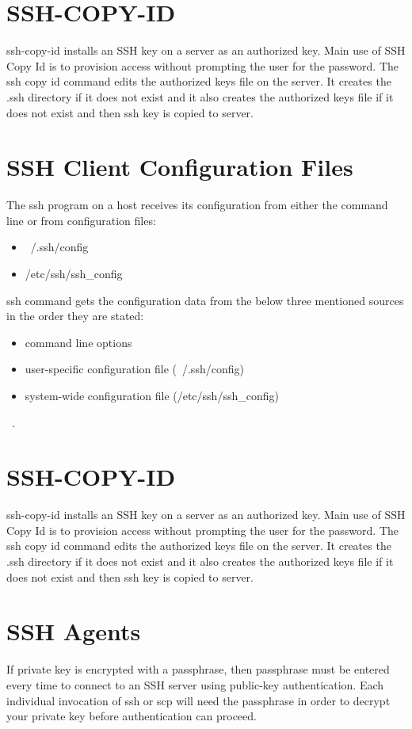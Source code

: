 \section{SSH-COPY-ID}
ssh-copy-id installs an SSH key on a server as an authorized key. 
Main use of SSH Copy Id is to provision access without prompting
the user for the password. The ssh copy id command edits the 
authorized keys file on the server. It creates the .ssh directory 
if it does not exist and it also creates the authorized keys file
if it does not exist and then ssh key is copied to server.

\section{SSH Client Configuration Files}
The ssh program on a host receives its configuration from either
the command line or from configuration files:
\begin{itemize}
\item ~/.ssh/config
\item /etc/ssh/ssh\_config
\end{itemize}

ssh command gets the configuration data from the below three 
mentioned sources in the order they are stated:

\begin{itemize}
\item command line options
\item user-specific configuration file (~/.ssh/config)
\item system-wide configuration file (/etc/ssh/ssh\_config)
\end{itemize}
~\cite{hid-sp18-513-sshkeyinc}. 

\section{SSH-COPY-ID}
ssh-copy-id installs an SSH key on a server as an authorized key. 
Main use of SSH Copy Id is to provision access without prompting
the user for the password. The ssh copy id command edits the 
authorized keys file on the server. It creates the .ssh directory 
if it does not exist and it also creates the authorized keys file
if it does not exist and then ssh key is copied to server.

\section{SSH Agents}
If private key is encrypted with a passphrase, then passphrase
must be entered every time to connect to an SSH server using
public-key authentication. Each individual invocation of ssh
or scp will need the passphrase in order to decrypt your
private key before authentication can proceed.

